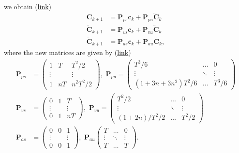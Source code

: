 we obtain (\href{https://github.com/mhubii/nmpc_pattern_generator/blob/5a213044c927dc6aac9f7e32ce1e5fb472cd67bb/libs/pattern_generator/src/base_generator.cpp#L887}{link})
\begin{align}
	\bm{C}_{k+1} &= \bm{P}_{ps} \bm{c}_k + \bm{P}_{pu}\dddot{\bm{C}}_k
	\label{eq::312_ckp1}\\
	\dot{\bm{C}}_{k+1} &= \bm{P}_{vs} \bm{c}_k + \bm{P}_{vu}\dddot{\bm{C}}_k
	\label{eq::312_dckp1}\\
	\ddot{\bm{C}}_{k+1} &= \bm{P}_{as} \bm{c}_k + \bm{P}_{au}\dddot{\bm{C}}_k,
	\label{eq::312_ddckp1}
\end{align}
where the new matrices are given by (\href{https://github.com/mhubii/nmpc_pattern_generator/blob/5a213044c927dc6aac9f7e32ce1e5fb472cd67bb/libs/pattern_generator/src/base_generator.cpp#L403}{link})
\begin{align}
	\bm{P}_{ps} &= \begin{pmatrix}
	1 & T & T^2/2 \\
	\vdots & & \vdots \\
	1 & nT & n^2T^2/2
	\end{pmatrix},\,\,
	\bm{P}_{pu} = \begin{pmatrix}
	T^3/6 & \dots & 0 \\
	\vdots & \ddots & \vdots \\
	(1+3n+3n^2)T^2/6 & \dots & T^3/6
	\end{pmatrix} \\
	\bm{P}_{vs} &= \begin{pmatrix}
	0 & 1 & T \\
	\vdots & & \vdots \\
	0 & 1 & nT
	\end{pmatrix},\,\,
	\bm{P}_{vu} = \begin{pmatrix}
	T^2/2 & \dots & 0 \\
	\vdots & \ddots & \vdots \\
	(1+2n)/T^2/2 & \dots & T^2/2
	\end{pmatrix} \\
	\bm{P}_{as} &= \begin{pmatrix}
	0 & 0 & 1 \\
	\vdots  &  & \vdots \\
	 0 & 0 & 1
	\end{pmatrix},\,\,
	\bm{P}_{au}\begin{pmatrix}
	T & \dots & 0 \\
	\vdots & \ddots & \vdots \\
	T & \dots & T
	\end{pmatrix}.
\end{align}
